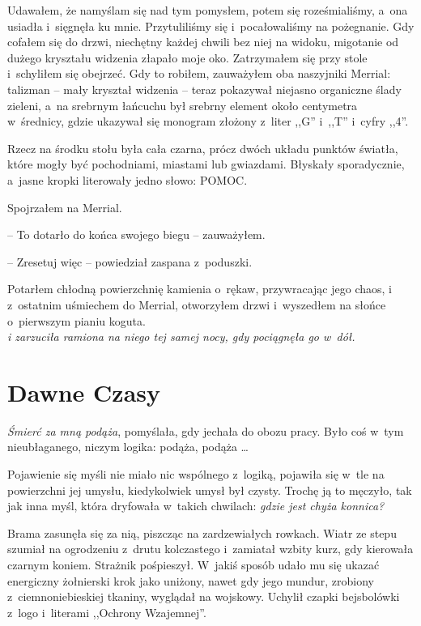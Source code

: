 \documentclass[oneside,polish,11pt,sfheadings]{mwbk}
\begin{document}
Udawałem, że namyślam się nad tym pomysłem, potem się roześmialiśmy, a~ona usiadła i~sięgnęła ku mnie. Przytuliliśmy się i~pocałowaliśmy na
pożegnanie. Gdy cofałem się do drzwi, niechętny każdej chwili bez niej
na widoku, migotanie od dużego kryształu widzenia złapało moje oko.
Zatrzymałem się przy stole i~schyliłem się obejrzeć. Gdy to robiłem,
zauważyłem oba naszyjniki Merrial: talizman -- mały kryształ widzenia -- teraz pokazywał niejasno organiczne ślady zieleni, a~na srebrnym
łańcuchu był srebrny element około centymetra w~średnicy, gdzie ukazywał
się monogram złożony z~liter ,,G'' i~,,T'' i~cyfry ,,4''.

Rzecz na środku stołu była cała czarna, prócz dwóch układu punktów
światła, które mogły być pochodniami, miastami lub gwiazdami. Błyskały
sporadycznie, a~jasne kropki literowały jedno słowo: POMOC.

Spojrzałem na Merrial. 

-- To dotarło do końca swojego biegu -- zauważyłem.

-- Zresetuj więc -- powiedział zaspana z~poduszki.

Potarłem chłodną powierzchnię kamienia o~rękaw, przywracając jego chaos,
i z~ostatnim uśmiechem do Merrial, otworzyłem drzwi i~wyszedłem na
słońce o~pierwszym pianiu koguta.\\
\textit{i zarzuciła ramiona na niego tej samej nocy, gdy pociągnęła go w~dół.}

\chapter{Dawne Czasy}

\textit{Śmierć za mną podąża}, pomyślała, gdy jechała do obozu pracy. Było
coś w~tym nieubłaganego, niczym logika: podąża, podąża \ldots 

Pojawienie się
myśli nie miało nic wspólnego z~logiką, pojawiła się w~tle na
powierzchni jej umysłu, kiedykolwiek umysł był czysty. Trochę ją to
męczyło, tak jak inna myśl, która dryfowała w~takich chwilach:
\textit{gdzie jest chyża konnica?}

Brama zasunęła się za nią, piszcząc na zardzewiałych rowkach. Wiatr ze
stepu szumiał na ogrodzeniu z~drutu kolczastego i~zamiatał wzbity kurz,
gdy kierowała czarnym koniem. Strażnik pośpieszył. W~jakiś sposób udało
mu się ukazać energiczny żołnierski krok jako uniżony, nawet gdy jego
mundur, zrobiony z~ciemnoniebieskiej tkaniny, wyglądał na wojskowy.
Uchylił czapki bejsbolówki z~logo i~literami ,,Ochrony Wzajemnej''.
\end{document}

